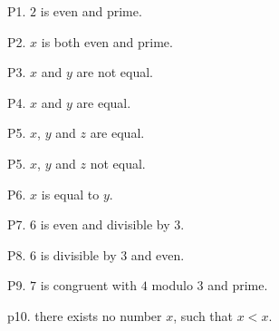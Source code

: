 P1. $2$ is even and prime.

P2. $x$ is both even and prime.

P3. $x$ and $y$ are not equal.

P4. $x$ and $y$ are equal.

P5. $x$, $y$ and $z$ are equal.

P5. $x$, $y$ and $z$ not equal.

P6. $x$ is equal to $y$.

P7. $6$ is even and divisible by $3$.

P8. $6$ is divisible by $3$ and even.

P9. $7$ is congruent with $4$ modulo $3$ and prime.

p10. there exists no number $x$, such that $x < x$.

